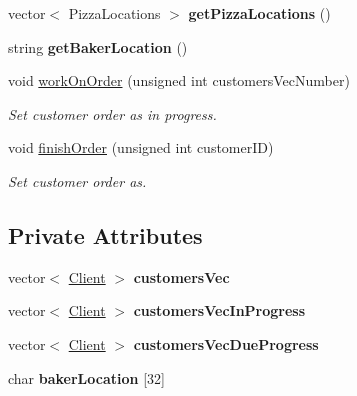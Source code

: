 \begin{CompactItemize}
\item 
\hypertarget{class_baker_3d38e7498fba59674c7d3838bf4c1824}{
vector$<$ Pizza\-Locations $>$ {\bf get\-Pizza\-Locations} ()}
\label{class_baker_3d38e7498fba59674c7d3838bf4c1824}

\item 
\hypertarget{class_baker_363b0d0c242923ca3a76ebd4e608cc2d}{
string {\bf get\-Baker\-Location} ()}
\label{class_baker_363b0d0c242923ca3a76ebd4e608cc2d}

\item 
void \hyperlink{class_baker_9616413c80f3814907a9c2399ac50438}{work\-On\-Order} (unsigned int customers\-Vec\-Number)
\begin{CompactList}\small\item\em Set customer order as in progress. \item\end{CompactList}\item 
void \hyperlink{class_baker_222a16bf113b70cbe0388a7291978a57}{finish\-Order} (unsigned int customer\-ID)
\begin{CompactList}\small\item\em Set customer order as. \item\end{CompactList}\end{CompactItemize}
\subsection*{Private Attributes}
\begin{CompactItemize}
\item 
\hypertarget{class_baker_52cc86469dd41b9be5b7186d6bd00589}{
vector$<$ \hyperlink{class_client}{Client} $>$ {\bf customers\-Vec}}
\label{class_baker_52cc86469dd41b9be5b7186d6bd00589}

\item 
\hypertarget{class_baker_0b7dacb9817ff529ee046a5c369051fa}{
vector$<$ \hyperlink{class_client}{Client} $>$ {\bf customers\-Vec\-In\-Progress}}
\label{class_baker_0b7dacb9817ff529ee046a5c369051fa}

\item 
\hypertarget{class_baker_e9843b8d2c12d0911de538ebe51c1b0d}{
vector$<$ \hyperlink{class_client}{Client} $>$ {\bf customers\-Vec\-Due\-Progress}}
\label{class_baker_e9843b8d2c12d0911de538ebe51c1b0d}

\item 
\hypertarget{class_baker_c8a23bee3af95af3a6fa8e3f631e9a92}{
char {\bf baker\-Location} \mbox{[}32\mbox{]}}
\label{class_baker_c8a23bee3af95af3a6fa8e3f631e9a92}

\end{CompactItemize}


